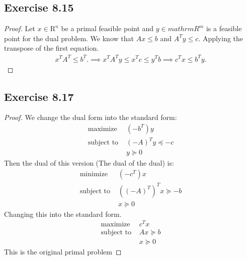 \documentclass[11.5pt, letterpaper, bibtotoc,
    tablecaptionabove, figurecaptionabove]{article}
\begin{document}
 \subsection*{Exercise 8.15}
 \begin{proof}
 	Let $x \in \mathrm{R}^n$ be a primal feasible point and $y \in mathrm{R}^m$ is a feasible point for the dual problem.  We know that $ Ax \leq b$ and $A^Ty \leq c$.  Applying the transpose of the first equation.
	\begin{align*}
		x^TA^T \leq b^T.  \implies x^TA^Ty \leq x^Tc \leq y^Tb \implies c^Tx \leq b^Ty.
	\end{align*}
 \end{proof}

 \subsection*{Exercise 8.17}
 \begin{proof}
	We change the dual form into the standard form:
	\begin{align*}
	\text{maximize  }& (-b^T)y \\
	\text{subject to  }& (-A)^Ty  \preceq -c \\
	& y \succeq  0
	\end{align*}
	Then the dual of this version (The dual of the dual) is:
	\begin{align*}
		\text{minimize  }& (-c^T)x \\
		\text{subject to  }& ((-A)^T)^Tx  \succeq -b \\
		& x \succeq  0
	\end{align*}
	Changing this into the standard form.
	\begin{align*}
		\text{maximize  }& c^Tx \\
		\text{subject to  }& Ax  \succeq b \\
		& x \succeq  0
	\end{align*}
	This is the original primal problem 
	
\end{proof}
 
\end{document}
